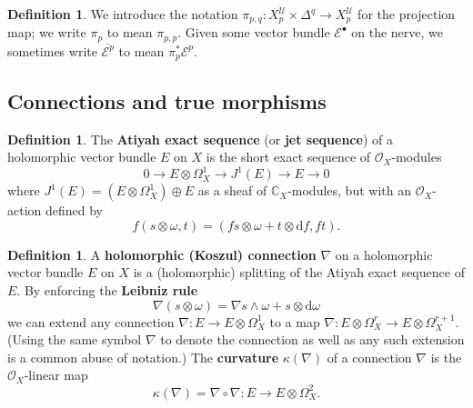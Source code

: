 \documentclass[11pt,fleqn]{article}
\theoremstyle{plain}
\theoremstyle{definition}
\newtheorem{definition}[theorem]{Definition}
\theoremstyle{remark}
\numberwithin{equation}{theorem}
\newcommand{\cover}{\mathcal{U}}
\newcommand{\OO}{\mathcal{O}}
\newcommand{\define}[1]{\textbf{#1}}
\newcommand{\nerve}[1]{X_{#1}^\cover}
\renewcommand{\d}{\mathrm{d}}
\begin{document}
    \begin{definition}
        We introduce the notation $\pi_{p,q}\colon\nerve{p}\times\Delta^q\to\nerve{p}$ for the projection map; we write $\pi_p$ to mean $\pi_{p,p}$.
        Given some vector bundle $\mathcal{E}^\bullet$ on the nerve, we sometimes write $\overline{\mathcal{E}^p}$ to mean $\pi_p^*\mathcal{E}^p$.
    \end{definition}

    \subsection{Connections and true morphisms}

        \begin{definition}
            The \define{Atiyah exact sequence} (or \define{jet sequence}) of a holomorphic vector bundle $E$ on $X$ is the short exact sequence of $\OO_X$-modules
            \[
                0
                \to
                E\otimes\Omega_X^1
                \to
                J^1(E)
                \to
                E
                \to
                0
            \]
            where $J^1(E)=(E\otimes\Omega_X^1)\oplus E$ as a sheaf of $\mathbb{C}_X$-modules, but with an $\OO_X$-action defined by
            \[
                f(s\otimes\omega,t)
                =
                (fs\otimes\omega + t\otimes\d f, ft).
            \]
        \end{definition}

        \begin{definition}
            A \define{holomorphic (Koszul) connection} $\nabla$ on a holomorphic vector bundle $E$ on $X$ is a (holomorphic) splitting of the Atiyah exact sequence of $E$.
            By enforcing the \define{Leibniz rule}
            \[
                \nabla(s\otimes\omega)
                =
                \nabla s\wedge\omega + s\otimes\d\omega
            \]
            we can extend any connection $\nabla\colon E\to E\otimes\Omega_X^1$ to a map $\nabla\colon E\otimes\Omega_X^r\to E\otimes\Omega_X^{r+1}$.
            (Using the same symbol $\nabla$ to denote the connection as well as any such extension is a common abuse of notation.)
            The \define{curvature} $\kappa(\nabla)$ of a connection $\nabla$ is the $\OO_X$-linear map
            \[
                \kappa(\nabla)=\nabla\circ\nabla\colon
                E\to E\otimes\Omega_X^2.
            \]
        \end{definition}
\end{document}
